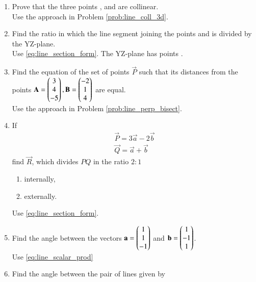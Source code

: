 \begin{enumerate}[label=\arabic*.,ref=\thesubsection.\theenumi]
\item Prove that the three points ,  and  are collinear.
%
\\
\solution  Use the approach in Problem \ref{prob:line_coll_3d}.
%
\item Find the ratio in which the line segment joining the points  and  is divided by the YZ-plane.
%
\\
\solution Use \eqref{eq:line_section_form}.  The YZ-plane has points .
%
\item Find the equation of the set of points $\vec{P}$ such that its distances from the points
$
\mathbf{A}=\begin{pmatrix}3\\4\\-5\end{pmatrix}, 
\mathbf{B}=\begin{pmatrix}-2\\1\\4\end{pmatrix}
$
are equal. 
%
\\
\solution Use the approach in Problem \ref{prob:line_perp_bisect}.
\item If 
\begin{align}
\vec{P} = 3\vec{a}-2\vec{b}
\\
\vec{Q} = \vec{a}+\vec{b}
\end{align}
%
find $\vec{R}$, which divides $PQ$ in the ratio $2:1$
\begin{enumerate}
\item internally,
\item externally.
\end{enumerate}
%
\solution Use \eqref{eq:line_section_form}.  
\item Find the angle between the vectors 
$\mathbf{a}=\begin{pmatrix}1\\1\\-1\end{pmatrix}$
  and 
$\mathbf{b}=\begin{pmatrix}1\\-1\\1\end{pmatrix}$.
%
\\
\solution Use \eqref{eq:line_scalar_prod}
%
\item Find the angle between the pair of lines given by 
\begin{align}

\end{align}
\end{enumerate}
